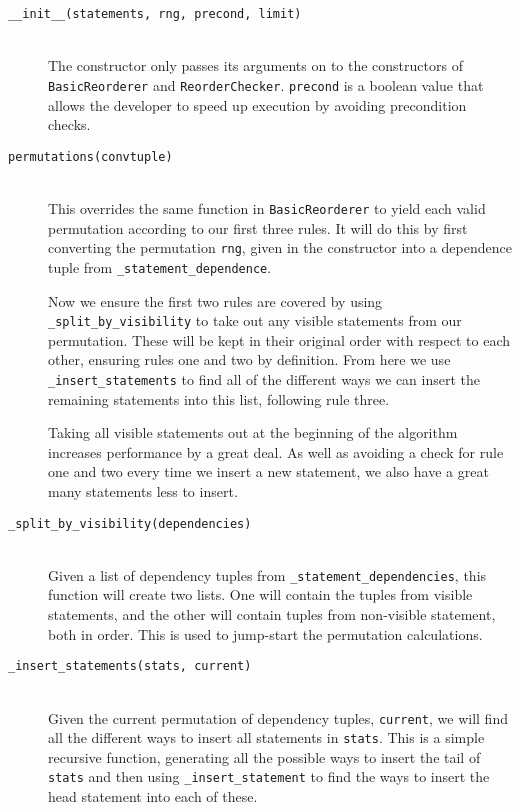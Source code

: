 \documentclass{report}
\begin{document}
\begin{description}
\item[\texttt{\_\_init\_\_(statements, rng, precond, limit)}] \hfill \\
The constructor only passes its arguments on to the constructors of \texttt{BasicReorderer} and \texttt{ReorderChecker}. \texttt{precond} is
a boolean value that allows the developer to speed up execution by avoiding precondition checks.

\item[\texttt{permutations(convtuple)}] \hfill \\
This overrides the same function in \texttt{BasicReorderer} to yield each valid permutation according to our first three rules. It will do this
by first converting the permutation \texttt{rng}, given in the constructor into a dependence tuple from \texttt{\_statement\_dependence}.

Now we ensure the first two rules are covered by using \texttt{\_split\_by\_visibility} to take out any visible statements from our permutation.
These will be kept in their original order with respect to each other, ensuring rules one and two by definition. From here we use
\texttt{\_insert\_statements} to find all of the different ways we can insert the remaining statements into this list, following rule three.

Taking all visible statements out at the beginning of the algorithm increases performance by a great deal. As well as avoiding a check for rule
one and two every time we insert a new statement, we also have a great many statements less to insert.

\item[\texttt{\_split\_by\_visibility(dependencies)}] \hfill \\
Given a list of dependency tuples from \texttt{\_statement\_dependencies}, this function will create two lists. One will contain the tuples from
visible statements, and the other will contain tuples from non-visible statement, both in order. This is used to jump-start the permutation
calculations.

\item[\texttt{\_insert\_statements(stats, current)}] \hfill \\
Given the current permutation of dependency tuples, \texttt{current}, we will find all the different ways to insert all statements in
\texttt{stats}. This is a simple recursive function, generating all the possible ways to insert the tail of \texttt{stats} and then using
\texttt{\_insert\_statement} to find the ways to insert the head statement into each of these.


\end{description}
\end{document}
